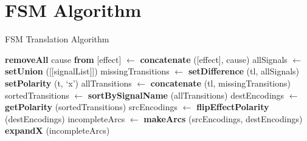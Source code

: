 \section{FSM Algorithm}\label{sec:algo}
\begin{algorithm}[]
\begin{algorithmic}
	\caption{FSM Translation Algorithm\label{alg:fsm}}
		\State \textbf{removeAll} cause \textbf{from} [effect]
		\State [signalList] $\leftarrow$ \textbf{concatenate} ([effect], cause)
	\EndFor
	\State allSignals $\leftarrow$ \textbf{setUnion} ([[signalList]])
		\State missingTransitions $\leftarrow$ \textbf{setDifference} (tl, allSignals)
			\State \textbf{setPolarity} (t, `x')
		\EndFor
		\State allTransitions $\leftarrow$ \textbf{concatenate} (tl, missingTransitions)
		\State sortedTransitions $\leftarrow$ \textbf{sortBySignalName} (allTransitions)
		\State destEncodings $\leftarrow$ \textbf{getPolarity} (sortedTransitions)
		\State srcEncodings $\leftarrow$ \textbf{flipEffectPolarity} (destEncodings)
		\State incompleteArcs $\leftarrow$ \textbf{makeArcs} (srcEncodings, destEncodings)
		\State \textbf{expandX} (incompleteArcs)
	\EndFor
\end{algorithmic}
\end{algorithm}
